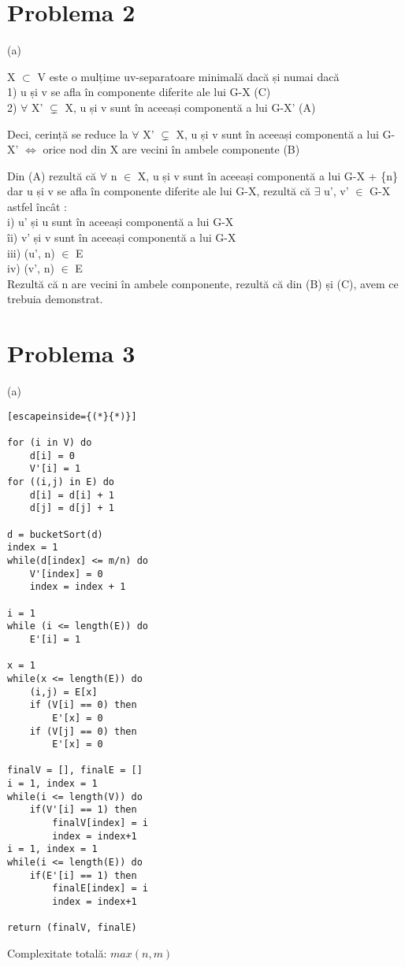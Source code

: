 \documentclass{article}
\begin{document}
\section*{Problema 2}

(a)

X $\subset$ V este o mulțime uv-separatoare minimală dacă și numai dacă\\
1) u și v se afla în componente diferite ale lui G-X         (C) \\
2) $\forall$  X'  $\subsetneq$  X, u și v sunt în aceeași componentă a lui G-X'     (A)

Deci, cerință se reduce la $\forall$ X' $\subsetneq$ X, u și v sunt în aceeași componentă a lui G-X'  $\iff$ orice nod din X are vecini în ambele componente (B)

Din (A) rezultă că $\forall$ n $\in$ X, u și v sunt în aceeași componentă a lui G-X + \{n\} dar u și v se afla în componente diferite ale lui G-X, rezultă că $\exists$ u', v' $\in$ G-X astfel încât :\\
i) u' și u sunt în aceeași componentă a lui G-X \\ 
îi) v' și v sunt în aceeași componentă a lui G-X \\
iii) (u', n) $\in$ E \\
iv) (v', n) $\in$ E \\

Rezultă că n are vecini în ambele componente, rezultă că din (B) și (C), avem ce trebuia demonstrat.



\section*{Problema 3}

(a)
\begin{lstlisting}[escapeinside={(*}{*)}]
 
for (i in V) do
	d[i] = 0
	V'[i] = 1
for ((i,j) in E) do
	d[i] = d[i] + 1
	d[j] = d[j] + 1

d = bucketSort(d)
index = 1
while(d[index] <= m/n) do
	V'[index] = 0
	index = index + 1

i = 1
while (i <= length(E)) do
	E'[i] = 1

x = 1
while(x <= length(E)) do
	(i,j) = E[x]
	if (V[i] == 0) then
		E'[x] = 0
	if (V[j] == 0) then
		E'[x] = 0

finalV = [], finalE = []
i = 1, index = 1
while(i <= length(V)) do
	if(V'[i] == 1) then 
		finalV[index] = i
		index = index+1
i = 1, index = 1
while(i <= length(E)) do
	if(E'[i] == 1) then 
		finalE[index] = i
		index = index+1

return (finalV, finalE)

\end{lstlisting}
Complexitate  totală: $max(n,m)$
\end{document}
